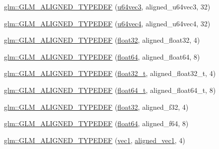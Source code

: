 \begin{DoxyCompactItemize}
\item 
\hyperlink{group__gtx__type__aligned_gae373b6c04fdf9879f33d63e6949c037e}{glm\+::\+G\+L\+M\+\_\+\+A\+L\+I\+G\+N\+E\+D\+\_\+\+T\+Y\+P\+E\+D\+EF} (\hyperlink{group__gtc__type__precision_ga7f104c29d70170cfb2223b29f7985bd4}{u64vec3}, aligned\+\_\+u64vec3, 32)
\item 
\hyperlink{group__gtx__type__aligned_ga53a8a03dca2015baec4584f45b8e9cdc}{glm\+::\+G\+L\+M\+\_\+\+A\+L\+I\+G\+N\+E\+D\+\_\+\+T\+Y\+P\+E\+D\+EF} (\hyperlink{group__gtc__type__precision_gadafdefd5524bf6a48bb7c47edb787ae5}{u64vec4}, aligned\+\_\+u64vec4, 32)
\item 
\hyperlink{group__gtx__type__aligned_gab3301bae94ef5bf59fbdd9a24e7d2a01}{glm\+::\+G\+L\+M\+\_\+\+A\+L\+I\+G\+N\+E\+D\+\_\+\+T\+Y\+P\+E\+D\+EF} (\hyperlink{group__gtc__type__precision_ga814f2f65354b6588b067cc5c67a6b340}{float32}, aligned\+\_\+float32, 4)
\item 
\hyperlink{group__gtx__type__aligned_ga75930684ff2233171c573e603f216162}{glm\+::\+G\+L\+M\+\_\+\+A\+L\+I\+G\+N\+E\+D\+\_\+\+T\+Y\+P\+E\+D\+EF} (\hyperlink{group__gtc__type__precision_gab721f828b41f46b20cf4883b50733d3b}{float64}, aligned\+\_\+float64, 8)
\item 
\hyperlink{group__gtx__type__aligned_gada9b0bea273d3ae0286f891533b9568f}{glm\+::\+G\+L\+M\+\_\+\+A\+L\+I\+G\+N\+E\+D\+\_\+\+T\+Y\+P\+E\+D\+EF} (\hyperlink{group__gtc__type__precision_ga642737ae3e7c434b366f2191e6944bf2}{float32\+\_\+t}, aligned\+\_\+float32\+\_\+t, 4)
\item 
\hyperlink{group__gtx__type__aligned_ga6e3a2d83b131336219a0f4c7cbba2a48}{glm\+::\+G\+L\+M\+\_\+\+A\+L\+I\+G\+N\+E\+D\+\_\+\+T\+Y\+P\+E\+D\+EF} (\hyperlink{group__gtc__type__precision_gade966a3eb25ebeb16dd53c40d3fdeb46}{float64\+\_\+t}, aligned\+\_\+float64\+\_\+t, 8)
\item 
\hyperlink{group__gtx__type__aligned_gadbce23b9f23d77bb3884e289a574ebd5}{glm\+::\+G\+L\+M\+\_\+\+A\+L\+I\+G\+N\+E\+D\+\_\+\+T\+Y\+P\+E\+D\+EF} (\hyperlink{group__gtc__type__precision_ga814f2f65354b6588b067cc5c67a6b340}{float32}, aligned\+\_\+f32, 4)
\item 
\hyperlink{group__gtx__type__aligned_gaa4deaa0dea930c393d55e7a4352b0a20}{glm\+::\+G\+L\+M\+\_\+\+A\+L\+I\+G\+N\+E\+D\+\_\+\+T\+Y\+P\+E\+D\+EF} (\hyperlink{group__gtc__type__precision_gab721f828b41f46b20cf4883b50733d3b}{float64}, aligned\+\_\+f64, 8)
\item 
\hyperlink{group__gtx__type__aligned_ga81bc497b2bfc6f80bab690c6ee28f0f9}{glm\+::\+G\+L\+M\+\_\+\+A\+L\+I\+G\+N\+E\+D\+\_\+\+T\+Y\+P\+E\+D\+EF} (\hyperlink{vec1_8hpp_a16030dae9029ed1eab1553a2183bbb79}{vec1}, \hyperlink{group__gtc__type__aligned_ga8cf75c112dfa39264b7ef65c2ed6b3c4}{aligned\+\_\+vec1}, 4)

\end{DoxyCompactItemize}
